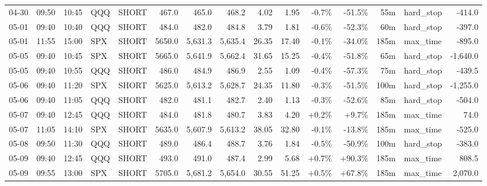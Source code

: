 \documentclass[11pt,a4paper,twoside]{article}
\begin{document}
\begin{landscape}
\begin{center}
\begin{longtable}{>{\color{txtmain}}l l l l l r r r r r r r r >{\color{txtmain}}l r}
04-30 & 09:50 & 10:45 & QQQ & SHORT & 467.0 & 465.0 & 468.2 & 4.02 & 1.95 & \textcolor{lossred}{-0.7\%} & \textcolor{lossred}{-51.5\%} & 55m & hard\_stop & \textcolor{lossred}{-414.0} \\
05-01 & 09:40 & 10:40 & QQQ & SHORT & 484.0 & 482.0 & 484.8 & 3.79 & 1.81 & \textcolor{lossred}{-0.6\%} & \textcolor{lossred}{-52.3\%} & 60m & hard\_stop & \textcolor{lossred}{-397.0} \\
05-01 & 11:55 & 15:00 & SPX & SHORT & 5650.0 & 5,631.3 & 5,635.4 & 26.35 & 17.40 & \textcolor{lossred}{-0.1\%} & \textcolor{lossred}{-34.0\%} & 185m & max\_time & \textcolor{lossred}{-895.0} \\
05-05 & 09:40 & 10:45 & SPX & SHORT & 5665.0 & 5,641.9 & 5,662.4 & 31.65 & 15.25 & \textcolor{lossred}{-0.4\%} & \textcolor{lossred}{-51.8\%} & 65m & hard\_stop & \textcolor{lossred}{-1,640.0} \\
05-05 & 09:40 & 10:55 & QQQ & SHORT & 486.0 & 484.9 & 486.9 & 2.55 & 1.09 & \textcolor{lossred}{-0.4\%} & \textcolor{lossred}{-57.3\%} & 75m & hard\_stop & \textcolor{lossred}{-439.5} \\
05-06 & 09:40 & 11:20 & SPX & SHORT & 5625.0 & 5,613.2 & 5,628.7 & 24.35 & 11.80 & \textcolor{lossred}{-0.3\%} & \textcolor{lossred}{-51.5\%} & 100m & hard\_stop & \textcolor{lossred}{-1,255.0} \\
05-06 & 09:40 & 11:05 & QQQ & SHORT & 482.0 & 481.1 & 482.7 & 2.40 & 1.13 & \textcolor{lossred}{-0.3\%} & \textcolor{lossred}{-52.6\%} & 85m & hard\_stop & \textcolor{lossred}{-504.0} \\
05-07 & 09:40 & 12:45 & QQQ & SHORT & 484.0 & 481.8 & 480.7 & 3.83 & 4.20 & \textcolor{wingreen}{+0.2\%} & \textcolor{wingreen}{+9.7\%} & 185m & max\_time & \textcolor{wingreen}{74.0} \\
05-07 & 11:05 & 14:10 & SPX & SHORT & 5635.0 & 5,607.9 & 5,613.2 & 38.05 & 32.80 & \textcolor{lossred}{-0.1\%} & \textcolor{lossred}{-13.8\%} & 185m & max\_time & \textcolor{lossred}{-525.0} \\
05-08 & 09:50 & 11:30 & QQQ & SHORT & 489.0 & 486.4 & 488.7 & 3.76 & 1.84 & \textcolor{lossred}{-0.5\%} & \textcolor{lossred}{-50.9\%} & 100m & hard\_stop & \textcolor{lossred}{-383.0} \\
05-09 & 09:40 & 12:45 & QQQ & SHORT & 493.0 & 491.0 & 487.4 & 2.99 & 5.68 & \textcolor{wingreen}{+0.7\%} & \textcolor{wingreen}{+90.3\%} & 185m & max\_time & \textcolor{wingreen}{808.5} \\
05-09 & 09:55 & 13:00 & SPX & SHORT & 5705.0 & 5,681.2 & 5,654.0 & 30.55 & 51.25 & \textcolor{wingreen}{+0.5\%} & \textcolor{wingreen}{+67.8\%} & 185m & max\_time & \textcolor{wingreen}{2,070.0} \\

\end{longtable}
\end{center}
\end{landscape}
\end{document}
